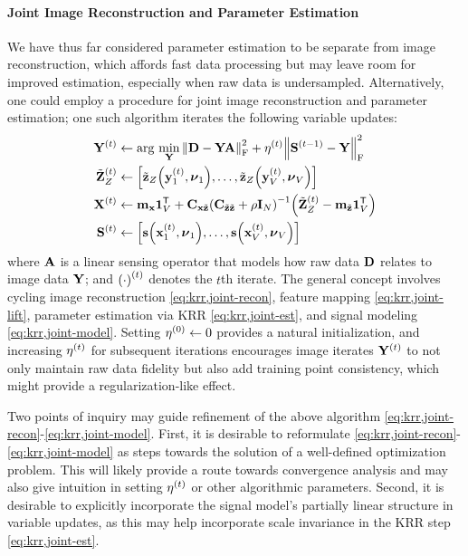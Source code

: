 \paragraph{Joint Image Reconstruction and Parameter Estimation}
We have thus far considered parameter estimation
to be separate from image reconstruction,
which affords fast data processing
but may leave room for improved estimation,
especially when raw data is undersampled.
Alternatively, 
one could employ a procedure
for joint image reconstruction and parameter estimation;
one such algorithm iterates the following variable updates:
\begin{align}
	\iter{\bmY}{t} &\gets
		\argmin{\bmY} \frob{\bmD - \bmY \bmA}^2 + 
		\iter{\eta}{t} \frob{\iter{\bmS}{t-1}-\bmY}^2
		\label{eq:krr,joint-recon} \\
	\iter{\bmZt}{t} &\gets 
		\brac{\bmztZa{\iter{\bmy}{t}_1,\bmnu_1},\dots,\bmztZa{\iter{\bmy}{t}_V,\bmnu_V}} 
		\label{eq:krr,joint-lift} \\
	\iter{\bmX}{t} &\gets
		\bmmx\ones{V}\tpose + \Cxzt\inv{\Cztzt + 
		\rho\eye{N}}\paren{\iter{\bmZt}{t} - \bmmzt\ones{V}\tpose}
		\label{eq:krr,joint-est} \\
	\iter{\bmS}{t} &\gets
		\brac{\bms\paren{\iter{\bmx}{t}_1,\bmnu_1},\dots,\bms\paren{\iter{\bmx}{t}_V,\bmnu_V}}
		\label{eq:krr,joint-model}
\end{align}
where $\mathbf{A}$ is a linear sensing operator 
that models how raw data $\mathbf{D}$
relates to image data $\mathbf{Y}$; 
and $\iter{\paren{\cdot}}{t}$ denotes the $t$th iterate.
The general concept involves cycling
image reconstruction \eqref{eq:krr,joint-recon},
feature mapping \eqref{eq:krr,joint-lift},
parameter estimation via KRR \eqref{eq:krr,joint-est},
and
signal modeling \eqref{eq:krr,joint-model}.
Setting $\iter{\eta}{0} \gets 0$ provides a natural initialization,
and increasing $\iter{\eta}{t}$ for subsequent iterations
encourages image iterates $\iter{\bmY}{t}$
to not only maintain raw data fidelity
but also add training point consistency,
which might provide a regularization-like effect.

Two points of inquiry may guide refinement
of the above algorithm
\eqref{eq:krr,joint-recon}-\eqref{eq:krr,joint-model}.
First, 
it is desirable to reformulate 
\eqref{eq:krr,joint-recon}-\eqref{eq:krr,joint-model}
as steps towards the solution
of a well-defined optimization problem.
This will likely provide 
a route towards convergence analysis
and may also give intuition 
in setting $\iter{\eta}{t}$
or other algorithmic parameters.
Second,
it is desirable 
to explicitly incorporate the signal model's 
partially linear structure
in variable updates,
as this may help incorporate
scale invariance 
in the KRR step \eqref{eq:krr,joint-est}.
